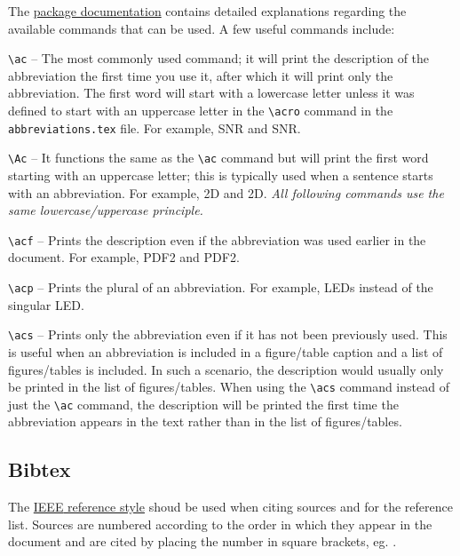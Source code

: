 \documentclass[a4paper, onecolumn, 12pt]{IEEEtran}
\begin{document}
The \href{https://ctan.math.washington.edu/tex-archive/macros/latex/contrib/acronym/acronym.pdf}{package documentation} contains detailed explanations regarding the available commands that can be used. A few useful commands include: 
\begin{compactitem}
    \item \verb|\ac| -- The most commonly used command; it will print the description of the abbreviation the first time you use it, after which it will print only the abbreviation. The first word will start with a lowercase letter unless it was defined to start with an uppercase letter in the \verb|\acro| command in the \verb|abbreviations.tex| file. For example, \ac{SNR} and \ac{SNR}.
    \item \verb|\Ac| -- It functions the same as the \verb|\ac| command but will print the first word starting with an uppercase letter; this is typically used when a sentence starts with an abbreviation. For example, \Ac{2D} and \Ac{2D}. \textit{All following commands use the same lowercase/uppercase principle.}
    \item \verb|\acf| -- Prints the description even if the abbreviation was used earlier in the document. For example, \acf{PDF2} and \Acf{PDF2}.
    \item \verb|\acp| -- Prints the plural of an abbreviation. For example, \acp{LED} instead of the singular \acf{LED}. 
    \item \verb|\acs| -- Prints only the abbreviation even if it has not been previously used. This is useful when an abbreviation is included in a figure/table caption and a list of figures/tables is included. In such a scenario, the description would usually only be printed in the list of figures/tables. When using the \verb|\acs| command instead of just the \verb|\ac| command, the description will be printed the first time the abbreviation appears in the text rather than in the list of figures/tables.
\end{compactitem}

\subsection{Bibtex}
\label{app:bibtex}

The \href{https://ieeeauthorcenter.ieee.org/wp-content/uploads/IEEE-Reference-Guide.pdf}{\Ac{IEEE} reference style} shoud be used when citing sources and for the reference list. Sources are numbered according to the order in which they appear in the document and are cited by placing the number in square brackets, eg. \cite{duPlessis_pracx_data}.
\end{document}

